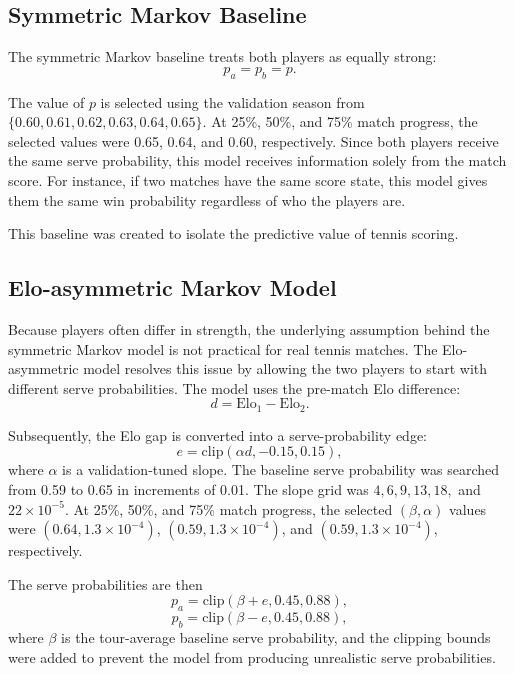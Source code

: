 \documentclass[10pt,twocolumn]{article}
\begin{document}
\subsection{Symmetric Markov Baseline}

The symmetric Markov baseline treats both players as equally strong:
\begin{equation}
p_a=p_b=p.
\end{equation}

The value of $p$ is selected using the validation season from $\{0.60,0.61,0.62,0.63,0.64,0.65\}$. At 25\%, 50\%, and 75\% match progress, the selected values were 0.65, 0.64, and 0.60, respectively. Since both players receive the same serve probability, this model receives information solely from the match score. For instance, if two matches have the same score state, this model gives them the same win probability regardless of who the players are.

This baseline was created to isolate the predictive value of tennis scoring.

\subsection{Elo-asymmetric Markov Model}

Because players often differ in strength, the underlying assumption behind the symmetric Markov model is not practical for real tennis matches. The Elo-asymmetric model resolves this issue by allowing the two players to start with different serve probabilities. The model uses the pre-match Elo difference:
\begin{equation}
d=\mathrm{Elo}_1-\mathrm{Elo}_2.
\end{equation}

Subsequently, the Elo gap is converted into a serve-probability edge:
\begin{equation}
e=\mathrm{clip}(\alpha d,-0.15,0.15),
\end{equation}
where $\alpha$ is a validation-tuned slope. The baseline serve probability was searched from 0.59 to 0.65 in increments of 0.01. The slope grid was $4,6,9,13,18,$ and $22\times10^{-5}$. At 25\%, 50\%, and 75\% match progress, the selected $(\beta,\alpha)$ values were $(0.64,1.3\times10^{-4})$, $(0.59,1.3\times10^{-4})$, and $(0.59,1.3\times10^{-4})$, respectively.

The serve probabilities are then
\begin{equation}
p_a=\mathrm{clip}(\beta+e,0.45,0.88),
\end{equation}
\begin{equation}
p_b=\mathrm{clip}(\beta-e,0.45,0.88),
\end{equation}
where $\beta$ is the tour-average baseline serve probability, and the clipping bounds were added to prevent the model from producing unrealistic serve probabilities.
\end{document}
